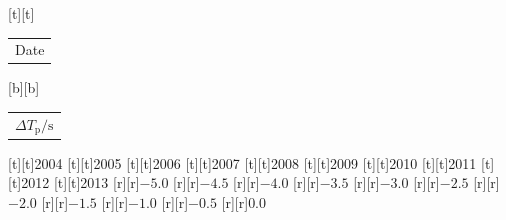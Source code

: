 %    
%
%
\begin{psfrags}%
\psfragscanon%
%
[t][t]{\color[rgb]{0,0,0}\setlength{\tabcolsep}{0pt}\begin{tabular}{c}{\Large{}Date}\end{tabular}}%
[b][b]{\color[rgb]{0,0,0}\setlength{\tabcolsep}{0pt}\begin{tabular}{c}{\Large{}$\Delta T_\mathrm{p}/\mathrm{s}$}\end{tabular}}%
%
[t][t]{2004}%
[t][t]{2005}%
[t][t]{2006}%
[t][t]{2007}%
[t][t]{2008}%
[t][t]{2009}%
[t][t]{2010}%
[t][t]{2011}%
[t][t]{2012}%
[t][t]{2013}%
%
[r][r]{$-5.0$}%
[r][r]{$-4.5$}%
[r][r]{$-4.0$}%
[r][r]{$-3.5$}%
[r][r]{$-3.0$}%
[r][r]{$-2.5$}%
[r][r]{$-2.0$}%
[r][r]{$-1.5$}%
[r][r]{$-1.0$}%
[r][r]{$-0.5$}%
[r][r]{$0.0$}%
%
%
\end{psfrags}%
%
